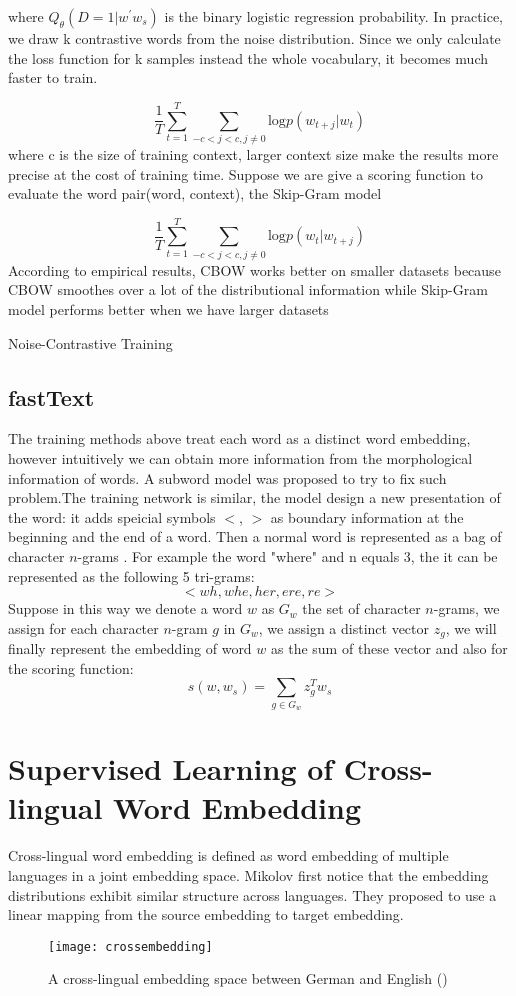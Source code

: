 	where ${Q_{\theta}{(D=1| w^{\prime} w_s)}}$ is the binary logistic regression probability. In practice, we draw k contrastive words from the noise distribution. Since we only calculate the loss function for k samples instead the whole vocabulary, it becomes much faster to train.
	
	
	\[\frac{1}{T} \sum_{t=1}^{T} \sum_{-c<j<c, j\neq 0}{\textrm{log}{p(w_{t+j}|w_t)}}\]
	where c is the size of training context, larger context size make the results more precise at the cost of training time. Suppose we are give a scoring function to evaluate the word pair(word, context), the Skip-Gram model
	
	\[\frac{1}{T} \sum_{t=1}^{T} \sum_{-c<j<c, j\neq 0}{\textrm{log}{p(w_{t}|w_{t+j})}}\]
	 According to  empirical results, CBOW works better on smaller datasets because CBOW smoothes over a lot of the distributional information while Skip-Gram model performs better when we have larger datasets
	
	
	Noise-Contrastive Training
	
	
	\subsection{fastText}
	The training methods above treat each word as a distinct word embedding, however intuitively we can obtain more information from the morphological information of words. A subword model was proposed to try to fix such problem.The training network is similar, the model design a new presentation of the word: it adds speicial symbols $<$, ${>}$ as boundary information at the beginning and the end of a word. Then a normal word is represented as a bag of character $n$-grams . For example the word "where" and n equals 3, the it can be represented as the following 5 tri-grams: 
	\[ <wh, whe, her, ere, re>\]
	Suppose in this way we denote a word ${w}$ as ${G_{w}}$ the set of character ${n}$-grams, we assign for each character ${n}$-gram $g$ in ${G_{w}}$, we assign a distinct vector $z_g$, we will finally represent the embedding of word ${w}$ as the sum of these vector and also for the scoring function:
	\[s(w, w_s) = \sum_{g \in G_{w}} z_g^{T} w_s \]
	
\section{Supervised Learning of Cross-lingual Word Embedding}



	Cross-lingual word embedding is defined as word embedding of multiple languages in a joint embedding space. Mikolov first notice that the embedding distributions exhibit similar structure across languages. They proposed to use a linear mapping from the source embedding to target embedding. \\
	\begin{figure}[t]
		\texttt{[image: crossembedding]}
		\centering
		\caption{A cross-lingual embedding space between German and English (\cite{ruder2017survey})}
	\end{figure}
	
